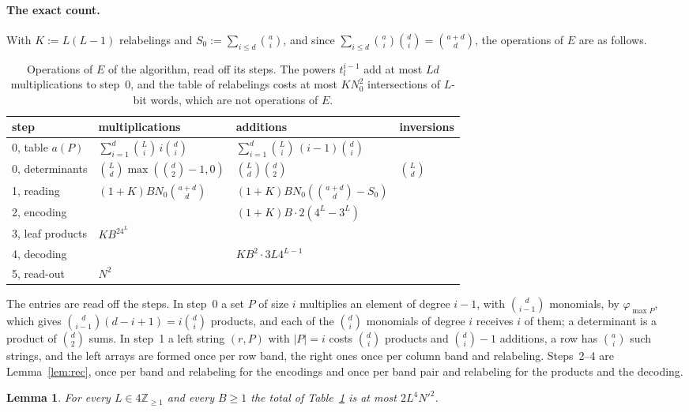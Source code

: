 \documentclass[11pt]{article}
\newtheorem{lemma}[theorem]{Lemma}
\theoremstyle{definition}
\theoremstyle{remark}
\newcommand{\Z}{\mathbb{Z}}
\newcommand{\Nz}{N_0}
\begin{document}
\paragraph{The exact count.} With $K:=L(L-1)$ relabelings and $S_0:=\sum_{i\le d}\binom ai$, and since $\sum_{i\le d}\binom ai\binom di=\binom{a+d}d$, the operations of $E$ are as follows.

\begin{table}[ht]
\centering\small
\renewcommand{\arraystretch}{1.25}
\begin{tabular}{@{}llll@{}}
\toprule
step & multiplications & additions & inversions\\
\midrule
0, table $a(P)$ & $\sum_{i=1}^d\binom Li\,i\binom di$ & $\sum_{i=1}^d\binom Li\,(i-1)\binom di$ & \\
0, determinants & $\binom Ld\max(\binom d2-1,0)$ & $\binom Ld\binom d2$ & $\binom Ld$\\
1, reading & $(1+K)B\Nz\binom{a+d}d$ & $(1+K)B\Nz(\binom{a+d}d-S_0)$ & \\
2, encoding & & $(1+K)B\cdot2(4^L-3^L)$ & \\
3, leaf products & $KB^24^L$ & & \\
4, decoding & & $KB^2\cdot3L4^{L-1}$ & \\
5, read-out & $N^2$ & & \\
\bottomrule
\end{tabular}
\caption{Operations of $E$ of the algorithm, read off its steps. The powers $t_l^{i-1}$ add at most $Ld$ multiplications to step~0, and the table of relabelings costs at most $K\Nz^2$ intersections of $L$-bit words, which are not operations of $E$.}\label{tab:count}
\end{table}

The entries are read off the steps. In step~0 a set $P$ of size $i$ multiplies an element of degree $i-1$, with $\binom d{i-1}$ monomials, by $\varphi_{\max P}$, which gives $\binom d{i-1}(d-i+1)=i\binom di$ products, and each of the $\binom di$ monomials of degree $i$ receives $i$ of them; a determinant is a product of $\binom d2$ sums. In step~1 a left string $(r,P)$ with $|P|=i$ costs $\binom di$ products and $\binom di-1$ additions, a row has $\binom ai$ such strings, and the left arrays are formed once per row band, the right ones once per column band and relabeling. Steps~2--4 are Lemma~\ref{lem:rec}, once per band and relabeling for the encodings and once per band pair and relabeling for the products and the decoding.

\begin{lemma}\label{lem:perentry}
For every $L\in4\Z_{\ge1}$ and every $B\ge1$ the total of Table~\ref{tab:count} is at most $2L^4N'^2$.
\end{lemma}
\end{document}
